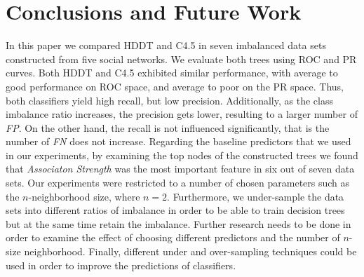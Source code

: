 \documentclass{acm_proc_article-sp}
\begin{document}
\section{Conclusions and Future Work}
\label{Sect.7}
In this paper we compared HDDT and C4.5 in seven imbalanced data sets constructed from five social networks. We evaluate both trees using ROC and PR curves. Both HDDT and C4.5 exhibited similar performance, with average to good performance on ROC space, and average to poor on the PR space. Thus, both classifiers yield high recall, but low precision. Additionally, as the class imbalance ratio increases, the precision gets lower, resulting to a larger number of \textit{FP}. On the other hand, the recall is not influenced significantly, that is the number of \textit{FN} does not increase. Regarding the baseline predictors that we used in our experiments, by examining the top nodes of the constructed trees we found that \textit{Associaton Strength} was the most important feature in six out of seven data sets. Our experiments were restricted to a number of chosen parameters such as the $n$-neighborhood size, where $n=2$. Furthermore, we under-sample the data sets into different ratios of imbalance in order to be able to train decision trees but at the same time retain the imbalance. Further research needs to be done in order to examine the effect of choosing different predictors and the number of $n$-size neighborhood. Finally, different under and over-sampling techniques could be used in order to improve the predictions of classifiers.


\end{document}
